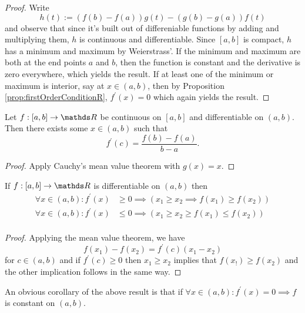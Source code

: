 \begin{proof}
	Write 
	\[
	h\left(t\right):=\left(f\left(b\right)-f\left(a\right)\right)g\left(t\right)-\left(g\left(b\right)-g\left(a\right)\right)f\left(t\right)
	\]
	and observe that since it's built out of differeniable functions by
	adding and multiplying them, $h$ is continuous and differentiable.
	Since $\left[a,b\right]$ is compact, $h$ has a minimum and maximum
	by Weierstrass'. If the minimum and maximum are both at the end points
	$a$ and $b$, then the function is constant and the derivative is
	zero everywhere, which yields the result. If at least one of the minimum
	or maximum is interior, say at $x\in\left(a,b\right)$, then by Proposition
	\ref{prop:firstOrderConditionR}, $f^{\prime}\left(x\right)=0$ which
	again yields the result.
\end{proof}
\begin{cor}
	\label{cor:meanValueThm}Let $f:\left[a,b\right]\to\R$ be continuous
	on $\left[a,b\right]$ and differentiable on $\left(a,b\right).$
	Then there exists some $x\in\left(a,b\right)$ such that
	\[
	f^{\prime}\left(c\right)=\frac{f\left(b\right)-f\left(a\right)}{b-a}.
	\]
\end{cor}

\begin{proof}
	Apply Cauchy's mean value theorem with $g\left(x\right)=x$.
\end{proof}
\begin{prop}
	\label{prop:derivativeAndMonotonicity}If $f:\left[a,b\right]\to\R$
	is differentiable on $\left(a,b\right)$ then
	\begin{align*}
		\forall x\in\left(a,b\right):f^{\prime}\left(x\right) & \geq0\implies\left(x_{1}\geq x_{2}\implies f\left(x_{1}\right)\geq f\left(x_{2}\right)\right)\\
		\forall x\in\left(a,b\right):f^{\prime}\left(x\right) & \leq0\implies\left(x_{1}\geq x_{2}\geq f\left(x_{1}\right)\leq f\left(x_{2}\right)\right)\\
	\end{align*}
\end{prop}

\begin{proof}
	Applying the mean value theorem, we have 
	\[
	f\left(x_{1}\right)-f\left(x_{2}\right)=f^{\prime}\left(c\right)\left(x_{1}-x_{2}\right)
	\]
	for $c\in\left(a,b\right)$ and if $f^{\prime}\left(c\right)\geq0$
	then $x_{1}\geq x_{2}$ implies that $f\left(x_{!}\right)\geq f\left(x_{2}\right)$
	and the other implication follows in the same way.
\end{proof}
\begin{rem*}
	An obvious corollary of the above result is that if $\forall x\in\left(a,b\right)$$:f^{\prime}\left(x\right)=0\implies f$
	is constant on $\left(a,b\right)$.
\end{rem*}

